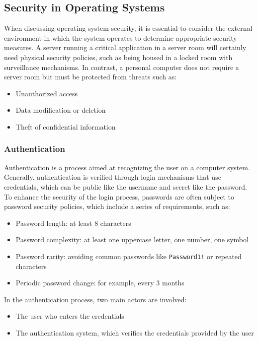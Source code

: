 \subsection{Security in Operating Systems}

When discussing operating system security, it is essential to consider the external environment in which the system operates to determine appropriate security measures. A server running a critical application in a server room will certainly need physical security policies, such as being housed in a locked room with surveillance mechanisms. In contrast, a personal computer does not require a server room but must be protected from threats such as:

\begin{itemize}
    \item Unauthorized access
    \item Data modification or deletion
    \item Theft of confidential information
\end{itemize}


\subsubsection{Authentication}
Authentication is a process aimed at recognizing the user on a computer system. Generally, authentication is verified through login mechanisms that use credentials, which can be public like the username and secret like the password. To enhance the security of the login process, passwords are often subject to password security policies, which include a series of requirements, such as:

\begin{itemize}
    \item Password length: at least 8 characters
    \item Password complexity: at least one uppercase letter, one number, one symbol
    \item Password rarity: avoiding common passwords like \texttt{Password1!} or repeated characters
    \item Periodic password change: for example, every 3 months
\end{itemize}

In the authentication process, two main actors are involved:

\begin{itemize}
    \item The user who enters the credentials
    \item The authentication system, which verifies the credentials provided by the user
\end{itemize}


